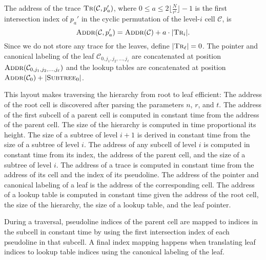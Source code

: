 The address of the trace \(\textsc{Tr}(\mathcal{C}, p_a')\),
where
\(0 \leq a \leq 2 \lfloor \frac{N}{r^{i}} \rfloor - 1\) is the first intersection
index of \(p_a'\) in the cyclic permutation of the level-\(i\) cell
\(\mathcal{C}\),
is
%
\begin{displaymath}
  \textsc{Addr}(\mathcal{C}, p_a')
  =
  \textsc{Addr}(\mathcal{C})
  + a \cdot |\textsc{Tr}_{i}|.
\end{displaymath}
%
Since we do not store any trace for the leaves,
define \(| \textsc{Tr}_{\ell} | = 0\).
The pointer and canonical labeling of the leaf
\(\mathcal{C}_{0, j_1, j_2, \ldots, j_{\ell}}\)
are concatenated at position
\(\textsc{Addr}(\mathcal{C}_{0, j_1, j_2, \ldots, j_{\ell}})\)
%
and
%
the lookup tables are concatenated at position
\(
\textsc{Addr}(\mathcal{C}_{0})
+
| \textsc{Subtree}_{0} |
\).

This layout makes traversing the hierarchy from root to leaf efficient:
%
The address of the root cell is discovered after parsing the parameters \(n\),
\(r\), and \(t\).
%
The address of the first subcell of a parent cell is computed in constant time
from the address of the parent cell.
%
The size of the hierarchy is computed in time proportional its height.
%
The size of a subtree of level \(i+1\) is derived in constant time from the
size of a subtree of level \(i\).
%
The address of any subcell of level \(i\) is computed in constant time from its
index, the address of the parent cell, and the size of a subtree of level
\(i\).
%
The address of a trace is computed in constant time from the address of its
cell and the index of its pseudoline.
%
The address of the pointer and canonical labeling of a leaf
is the address of the corresponding cell.
%
The address of a lookup table is computed in constant time given the address of
the root cell, the size of the hierarchy, the size of a lookup table, and the
leaf pointer.

During a traversal, pseudoline indices of the parent cell are mapped to
indices in the subcell in constant time by using the first intersection index
of each pseudoline in that subcell. A final index mapping happens when translating leaf indices
to lookup table indices using the canonical labeling of the leaf.
